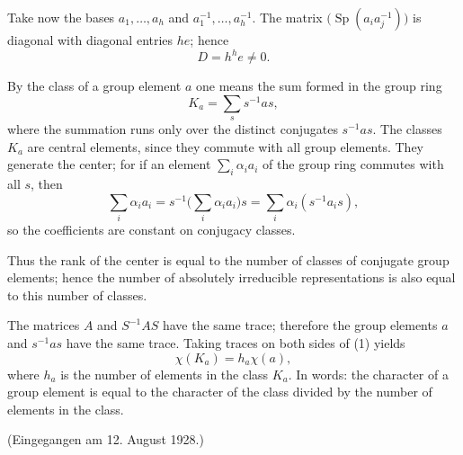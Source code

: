 \documentclass[11pt]{article}
\begin{document}
Take now the bases $a_1,\ldots,a_h$ and $a_1^{-1},\ldots,a_h^{-1}$. The matrix $\bigl(\operatorname{Sp}(a_i a_j^{-1})\bigr)$ is diagonal with diagonal entries $he$; hence
\[
        D=h^h e\ne0.
\]

By the class of a group element $a$ one means the sum formed in the group ring
\[
        K_a=\sum_s s^{-1}as,                              \tag{1}
\]
where the summation runs only over the distinct conjugates $s^{-1}as$. The classes $K_a$ are central elements, since they commute with all group elements. They generate the center; for if an element $\sum_i \alpha_i a_i$ of the group ring commutes with all $s$, then
\[
        \sum_i\alpha_i a_i=s^{-1}\biggl(\sum_i\alpha_i a_i\biggr)s
        =\sum_i\alpha_i(s^{-1}a_i s),
\]
so the coefficients are constant on conjugacy classes.

Thus the rank of the center is equal to the number of classes of conjugate group elements; hence the number of absolutely irreducible representations is also equal to this number of classes.

The matrices $A$ and $S^{-1}AS$ have the same trace; therefore the group elements $a$ and $s^{-1}as$ have the same trace. Taking traces on both sides of (1) yields
\[
        \chi(K_a)=h_a\chi(a),
\]
where $h_a$ is the number of elements in the class $K_a$. In words: the character of a group element is equal to the character of the class divided by the number of elements in the class.

\begin{center}
(Eingegangen am 12. August 1928.)
\end{center}
\end{document}
